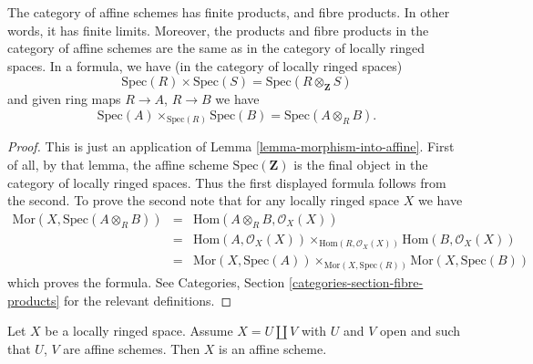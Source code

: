 \begin{lemma}
\label{lemma-fibre-product-affine-schemes}
The category of affine schemes has finite products, and fibre products.
In other words, it has finite limits. Moreover, the products
and fibre products in the category of affine schemes
are the same as in the category of locally ringed spaces.
In a formula, we have (in the category of locally ringed spaces)
$$
\text{Spec}(R) \times \text{Spec}(S) =
\text{Spec}(R \otimes_{\mathbf{Z}} S)
$$
and given ring maps $R \to A$, $R \to B$ we have
$$
\text{Spec}(A) \times_{\text{Spec}(R)} \text{Spec}(B)
=
\text{Spec}(A \otimes_R B).
$$
\end{lemma}

\begin{proof}
This is just an application of Lemma \ref{lemma-morphism-into-affine}.
First of all, by that lemma, the affine scheme
$\text{Spec}(\mathbf{Z})$ is the final object in the category
of locally ringed spaces. Thus the first displayed formula
follows from the second. To prove the second note that
for any locally ringed space $X$ we have
\begin{eqnarray*}
\text{Mor}(X, \text{Spec}(A \otimes_R B))
& = &
\text{Hom}(A \otimes_R B, \mathcal{O}_X(X)) \\
& = &
\text{Hom}(A, \mathcal{O}_X(X))
\times_{\text{Hom}(R, \mathcal{O}_X(X))}
\text{Hom}(B, \mathcal{O}_X(X)) \\
& = &
\text{Mor}(X, \text{Spec}(A))
\times_{\text{Mor}(X, \text{Spec}(R))}
\text{Mor}(X, \text{Spec}(B))
\end{eqnarray*}
which proves the formula.
See Categories, Section \ref{categories-section-fibre-products} for the
relevant definitions.
\end{proof}

\begin{lemma}
\label{lemma-disjoint-union-affines}
Let $X$ be a locally ringed space.
Assume $X = U \amalg V$ with $U$ and $V$ open and
such that $U$, $V$ are affine schemes. Then $X$ is an affine scheme.
\end{lemma}

